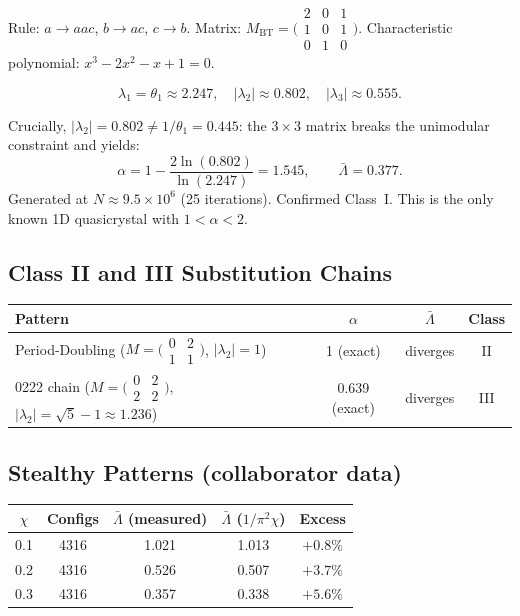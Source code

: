 \documentclass[11pt,letterpaper]{article}
\begin{document}
Rule: $a\to aac$, $b\to ac$, $c\to b$.
Matrix: $M_\text{BT} = \bigl(\begin{smallmatrix}2&0&1\\1&0&1\\0&1&0\end{smallmatrix}\bigr)$.
Characteristic polynomial: $x^3 - 2x^2 - x + 1 = 0$.

\[
\lambda_1 = \theta_1 \approx 2.247, \quad |\lambda_2| \approx 0.802, \quad |\lambda_3| \approx 0.555.
\]

Crucially, $|\lambda_2| = 0.802 \neq 1/\theta_1 = 0.445$: the $3\times3$ matrix breaks the
unimodular constraint and yields:
\[
\alpha = 1 - \frac{2\ln(0.802)}{\ln(2.247)} = 1.545, \qquad \bar\Lambda = 0.377.
\]
Generated at $N\approx9.5\times10^6$ (25 iterations). Confirmed Class~I.
This is the only known 1D quasicrystal with $1 < \alpha < 2$.

\subsection{Class II and III Substitution Chains}

\begin{table}[H]\centering
\begin{tabular}{lccc}
\toprule
\textbf{Pattern} & $\alpha$ & $\bar\Lambda$ & \textbf{Class} \\
\midrule
Period-Doubling ($M=\bigl(\begin{smallmatrix}0&2\\1&1\end{smallmatrix}\bigr)$, $|\lambda_2|=1$) & 1 (exact) & diverges & II \\
0222 chain ($M=\bigl(\begin{smallmatrix}0&2\\2&2\end{smallmatrix}\bigr)$, $|\lambda_2|=\sqrt5-1\approx1.236$) & 0.639 (exact) & diverges & III \\
\bottomrule
\end{tabular}
\end{table}

\subsection{Stealthy Patterns (collaborator data)}

\begin{table}[H]\centering
\begin{tabular}{ccccc}
\toprule
$\chi$ & Configs & $\bar\Lambda$ (measured) & $\bar\Lambda$ ($1/\pi^2\chi$) & Excess \\
\midrule
0.1 & 4316 & 1.021 & 1.013 & $+0.8\%$ \\
0.2 & 4316 & 0.526 & 0.507 & $+3.7\%$ \\
0.3 & 4316 & 0.357 & 0.338 & $+5.6\%$ \\
\bottomrule
\end{tabular}
\end{table}
\end{document}

